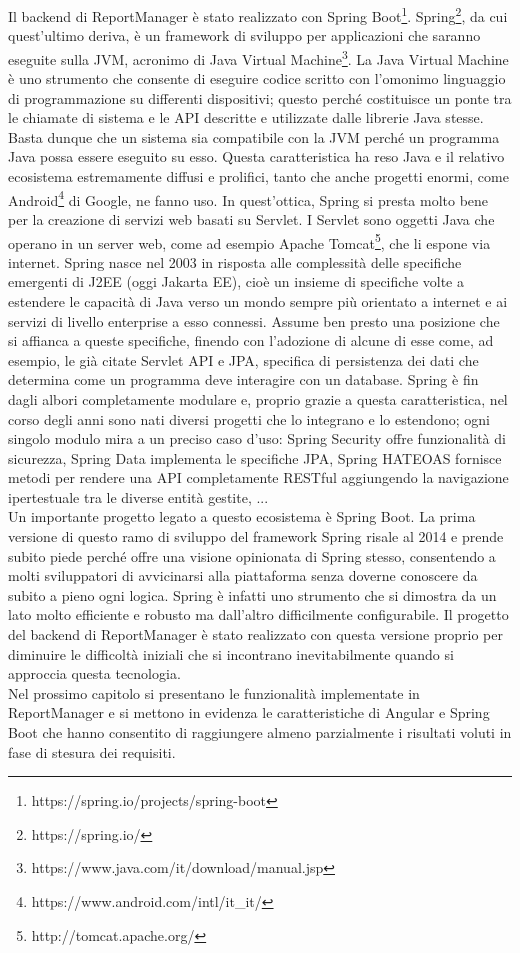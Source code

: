 Il backend di ReportManager è stato realizzato con Spring Boot\footnote{https://spring.io/projects/spring-boot}.
Spring\footnote{https://spring.io/}, da cui quest'ultimo deriva, è un framework di sviluppo per applicazioni che saranno eseguite sulla JVM, 
acronimo di Java Virtual Machine\footnote{https://www.java.com/it/download/manual.jsp}.
La Java Virtual Machine è uno strumento che consente di eseguire codice scritto con l'omonimo linguaggio di programmazione su differenti dispositivi; questo perché costituisce un ponte
tra le chiamate di sistema e le API descritte e utilizzate dalle librerie Java stesse.
Basta dunque che un sistema sia compatibile con la JVM perché un programma Java possa essere eseguito su esso.
Questa caratteristica ha reso Java e il relativo ecosistema estremamente diffusi e prolifici, tanto che anche progetti enormi, come Android\footnote{https://www.android.com/intl/it\_it/} 
di Google, ne fanno uso.
In quest'ottica, Spring si presta molto bene per la creazione di servizi web basati su Servlet.
I Servlet sono oggetti Java che operano in un server web, come ad esempio Apache Tomcat\footnote{http://tomcat.apache.org/}, che li espone via internet.
Spring nasce nel 2003 in risposta alle complessità delle specifiche emergenti di J2EE (oggi Jakarta EE), cioè un insieme di specifiche volte a estendere le capacità di Java verso un mondo sempre più
orientato a internet e ai servizi di livello enterprise a esso connessi.
Assume ben presto una posizione che si affianca a queste specifiche, finendo con l'adozione di alcune di esse come, ad esempio, le già citate Servlet API e JPA, specifica di persistenza
dei dati che determina come un programma deve interagire con un database.
Spring è fin dagli albori completamente modulare e, proprio grazie a questa caratteristica, nel corso degli anni sono nati diversi progetti che lo integrano e lo estendono;
ogni singolo modulo mira a un preciso caso d'uso: Spring Security offre funzionalità di sicurezza, Spring Data implementa le specifiche JPA, Spring HATEOAS fornisce metodi per rendere
una API completamente RESTful aggiungendo la navigazione ipertestuale tra le diverse entità gestite, ...
\\
Un importante progetto legato a questo ecosistema è Spring Boot.
La prima versione di questo ramo di sviluppo del framework Spring risale al 2014 e prende subito piede perché offre una visione opinionata di Spring stesso, consentendo a molti
sviluppatori di avvicinarsi alla piattaforma senza doverne conoscere da subito a pieno ogni logica.
Spring è infatti uno strumento che si dimostra da un lato molto efficiente e robusto ma dall'altro difficilmente configurabile.
Il progetto del backend di ReportManager è stato realizzato con questa versione proprio per diminuire le difficoltà iniziali che si incontrano inevitabilmente
quando si approccia questa tecnologia.
\\
Nel prossimo capitolo si presentano le funzionalità implementate in ReportManager e si mettono in evidenza le caratteristiche di Angular e Spring Boot che hanno consentito di raggiungere
almeno parzialmente i risultati voluti in fase di stesura dei requisiti.